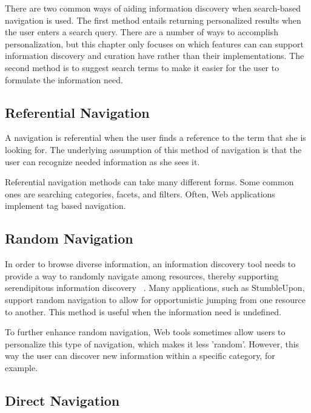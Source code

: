 {{There are two common ways of aiding information discovery when search-based navigation is used. The first method entails returning personalized results when the user enters a search query. There are a number of ways to accomplish personalization, but this chapter only focuses on which features can can support information discovery and curation have rather than their implementations. The second method is to suggest search terms to make it easier for the user to formulate the information need. 

} %

{\subsection{Referential Navigation}
A navigation is referential when the user finds a reference to the term that she is looking for.  The underlying assumption of this method of navigation is that the user can recognize needed information as she sees it.

Referential navigation methods can take many different forms. Some common ones are searching categories, facets, and filters. Often, Web applications implement tag based navigation. 



} %

{\subsection{Random Navigation}
In order to browse diverse information, an information discovery tool needs to provide a way to randomly navigate among resources, thereby supporting serendipitous information discovery ~\cite{foster}. Many applications, such as StumbleUpon, support random navigation to allow for opportunistic jumping from one resource to another. This method is useful when the information need is undefined.

To further enhance random navigation, Web tools sometimes allow users to personalize this type of navigation, which makes it less 'random'. However, this way the user can discover new information within a specific category, for example.
} %

{\subsection{Direct Navigation}

} %

}

